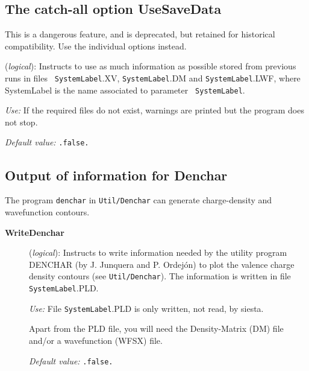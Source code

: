 \documentclass[11pt]{article}
\begin{document}
\vspace{5pt}
\subsection{The catch-all option UseSaveData}

This is a dangerous feature, and is deprecated, but retained for
historical compatibility. Use the individual options instead.

\begin{description}
\itemsep 10pt
\parsep 0pt


\item[{\bf UseSaveData}] ({\it logical}):   Instructs to use as
  much information as possible stored from previous runs in files {\tt
    SystemLabel}.XV, {\tt SystemLabel}.DM and {\tt SystemLabel}.LWF,
  where SystemLabel is the name associated to parameter {\tt
    SystemLabel}.

{\it Use:} If the required files do not exist, warnings are
printed but the program does not stop.

{\it Default value:} {\tt .false.}

\end{description}

\vspace{5pt}
\subsection{Output of information for Denchar}

The program {\tt denchar} in {\tt Util/Denchar} can generate
charge-density and wavefunction contours.

\begin{description}

\item[{\bf WriteDenchar}] ({\it logical}):  
  Instructs to write information needed by the utility program DENCHAR
  (by J. Junquera and P. Ordej\'on) to plot the valence charge density
  contours (see {\tt Util/Denchar}). The information is written in
  file {\tt SystemLabel}.PLD.

{\it Use:} File {\tt SystemLabel}.PLD is only written, not read, by siesta.

Apart from the PLD file, you will need the Density-Matrix (DM) file
and/or a wavefunction (WFSX) file. 

{\it Default value:} {\tt .false.}

\end{description}
\end{document}
